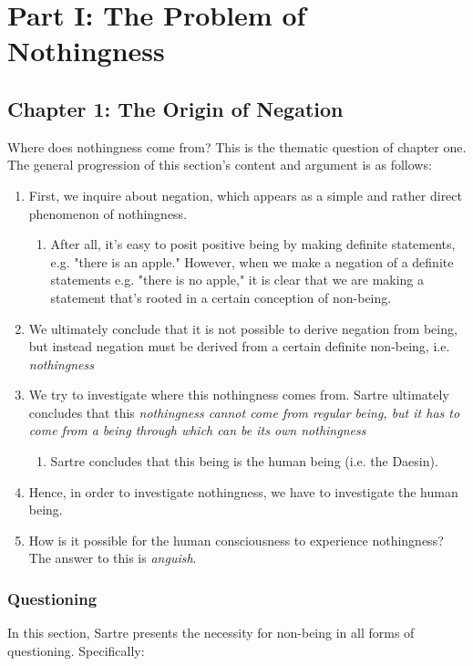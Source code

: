 \section{Part I: The Problem of Nothingness}

\subsection{Chapter 1: The Origin of Negation}
Where does nothingness come from? This is the thematic question of chapter one. The general progression of this section's content and argument is as follows:

\begin{enumerate}
  \item First, we inquire about negation, which appears as a simple and rather direct phenomenon of nothingness.
  \begin{enumerate}
    \item After all, it's easy to posit positive being by making definite statements, e.g. "there is an apple." However, when we make a negation of a definite statements e.g. "there is no apple," it is clear that we are making a statement that's rooted in a certain conception of non-being.
  \end{enumerate}
  \item We ultimately conclude that it is not possible to derive negation from being, but instead negation must be derived from a certain definite non-being, i.e. \emph{nothingness}
  \item We try to investigate where this nothingness comes from. Sartre ultimately concludes that this \emph{nothingness cannot come from regular being, but it has to come from a being through which can be its own nothingness}
  \begin{enumerate}
    \item Sartre concludes that this being is the human being (i.e. the Daesin).
  \end{enumerate}
  \item Hence, in order to investigate nothingness, we have to investigate the human being.
  \item How is it possible for the human consciousness to experience nothingness? The answer to this is \emph{anguish}.
\end{enumerate}

\subsubsection{Questioning}
In this section, Sartre presents the necessity for non-being in all forms of questioning. Specifically:

